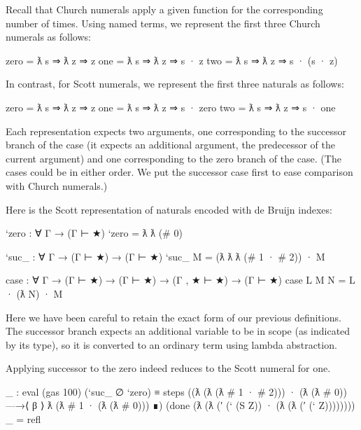 Recall that Church numerals apply a given function for the corresponding
number of times. Using named terms, we represent the first three Church
numerals as follows:

\begin{myDisplay}
zero  =  ƛ s ⇒ ƛ z ⇒ z
one   =  ƛ s ⇒ ƛ z ⇒ s · z
two   =  ƛ s ⇒ ƛ z ⇒ s · (s · z)
\end{myDisplay}

In contrast, for Scott numerals, we represent the first three naturals
as follows:

\begin{myDisplay}
zero = ƛ s ⇒ ƛ z ⇒ z
one  = ƛ s ⇒ ƛ z ⇒ s · zero
two  = ƛ s ⇒ ƛ z ⇒ s · one
\end{myDisplay}

Each representation expects two arguments, one corresponding to the
successor branch of the case (it expects an additional argument, the
predecessor of the current argument) and one corresponding to the zero
branch of the case. (The cases could be in either order. We put the
successor case first to ease comparison with Church numerals.)

Here is the Scott representation of naturals encoded with de Bruijn
indexes:

\begin{fence}
\begin{code}
`zero : ∀ {Γ} → (Γ ⊢ ★)
`zero = ƛ ƛ (# 0)

`suc_ : ∀ {Γ} → (Γ ⊢ ★) → (Γ ⊢ ★)
`suc_ M  = (ƛ ƛ ƛ (# 1 · # 2)) · M

case : ∀ {Γ} → (Γ ⊢ ★) → (Γ ⊢ ★) → (Γ , ★ ⊢ ★)  → (Γ ⊢ ★)
case L M N = L · (ƛ N) · M
\end{code}
\end{fence}

Here we have been careful to retain the exact form of our previous
definitions. The successor branch expects an additional variable to be
in scope (as indicated by its type), so it is converted to an ordinary
term using lambda abstraction.

Applying successor to the zero indeed reduces to the Scott numeral for
one.

\begin{fence}
\begin{code}
_ : eval (gas 100) (`suc_ {∅} `zero) ≡
    steps
        ((ƛ (ƛ (ƛ # 1 · # 2))) · (ƛ (ƛ # 0))
    —→⟨ β ⟩
         ƛ (ƛ # 1 · (ƛ (ƛ # 0)))
    ∎)
    (done (ƛ (ƛ (′ (` (S Z)) · (ƛ (ƛ (′ (` Z))))))))
_ = refl
\end{code}
\end{fence}

